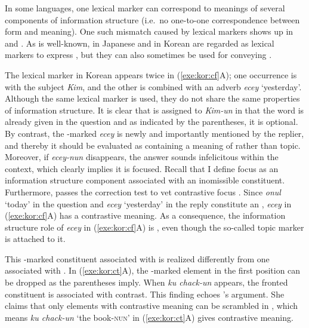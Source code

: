 In some languages, one lexical marker can correspond to meanings of
several components of information structure (i.e.\ no one-to-one
correspondence between form and meaning).  One such mismatch caused by
lexical markers shows up in  and . As is
well-known, \wa in Japanese and \nun in Korean are regarded as lexical
markers to express , but they can also sometimes be used for
conveying .





\noindent The lexical marker \nun in Korean appears twice in
(\ref{exe:kor:cf}A); one occurrence is with the subject \textit{Kim},
and the other is combined with an adverb \textit{ecey}
`yesterday'. Although the same lexical marker is used, they do not share the same properties of information
structure. It is clear that  is assigned to \textit{Kim-un} in
that the word is already given in the question and as indicated by the
parentheses, it is optional. By contrast, the \nun-marked
\textit{ecey} is newly and importantly mentioned by the replier, and
thereby it should be evaluated as containing a meaning of  rather
than topic. Moreover, if \textit{ecey-nun} disappears, the answer
sounds infelicitous within the context, which clearly implies it is
focused. Recall that I define focus as an information structure
component associated with an inomissible constituent.  Furthermore,
 passes the correction test to vet contrastive focus
\citep{gryllia:09}. Since \textit{onul} `today' in
the question and \textit{ecey} `yesterday' in the reply constitute an
, \textit{ecey} in (\ref{exe:kor:cf}A) has a
contrastive meaning.  As a consequence, the information structure role
of \textit{ecey} in (\ref{exe:kor:cf}A) is , even
though the so-called topic marker \nun is attached to it.



This \nun-marked constituent associated with  is
realized differently from one associated with . In
(\ref{exe:kor:ct}A), the \nun-marked element in the first position can
be dropped as the parentheses imply. When \textit{ku chack-un}
appears, the fronted constituent is associated with contrast.  This
finding echoes \citet{choi:99}'s argument. She claims that only
elements with contrastive meaning can be scrambled in ,
which means \textit{ku chack-un} `the book-\textsc{nun}' in
(\ref{exe:kor:ct}A) gives contrastive meaning.

